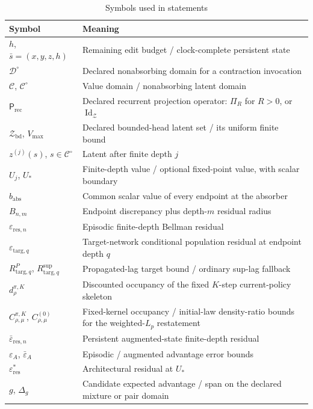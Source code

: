 \documentclass{article}
\theoremstyle{plain}
\theoremstyle{definition}
\theoremstyle{remark}
\newcommand{\ZZ}{\mathcal{Z}}
\begin{document}
\begin{table}[t]
\caption{Symbols used in statements}
\label{tab:notation}
\begin{center}
\begin{tabularx}{\linewidth}{@{}lX@{}}
\toprule
Symbol & Meaning \\
\midrule
$h$, $\bar s=(x,y,z,h)$ & Remaining edit budget / clock-complete persistent state \\
$\mathcal D^\circ$ & Declared nonabsorbing domain for a contraction invocation \\
$\mathcal C$, $\mathcal C^\circ$ & Value domain / nonabsorbing latent domain \\
$\mathsf P_{\mathrm{rec}}$ & Declared recurrent projection operator: $\Pi_R$ for $R>0$, or $\operatorname{Id}_{\ZZ}$ \\
$\mathcal Z_{\mathrm{bd}}$, $V_{\max}$ & Declared bounded-head latent set / its uniform finite bound \\
$z^{(j)}(s)$, $s\in\mathcal C^\circ$ & Latent after finite depth $j$ \\
$U_j$, $U_*$ & Finite-depth value / optional fixed-point value, with scalar boundary \\
$b_{\mathrm{abs}}$ & Common scalar value of every endpoint at the absorber \\
$B_{n,m}$ & Endpoint discrepancy plus depth-$m$ residual radius \\
$\varepsilon_{\mathrm{res},n}$ & Episodic finite-depth Bellman residual \\
$\varepsilon_{\mathrm{targ},q}$ & Target-network conditional population residual at endpoint depth $q$ \\
$R_{\mathrm{targ},q}^{P}$, $R_{\mathrm{targ},q}^{\sup}$ & Propagated-lag target bound / ordinary sup-lag fallback \\
$d_\rho^{\pi,K}$ & Discounted occupancy of the fixed $K$-step current-policy skeleton \\
$C_{\rho,\mu}^{\pi,K}$, $C_{\rho,\mu}^{(0)}$ & Fixed-kernel occupancy / initial-law density-ratio bounds for the weighted-$L_p$ restatement \\
$\bar\varepsilon_{\mathrm{res},n}$ & Persistent augmented-state finite-depth residual \\
$\varepsilon_A$, $\bar\varepsilon_A$ & Episodic / augmented advantage error bounds \\
$\varepsilon_{\mathrm{res}}^*$ & Architectural residual at $U_*$ \\
$g$, $\Delta_g$ & Candidate expected advantage / span on the declared mixture or pair domain \\

\end{tabularx}
\end{center}
\end{table}
\end{document}
